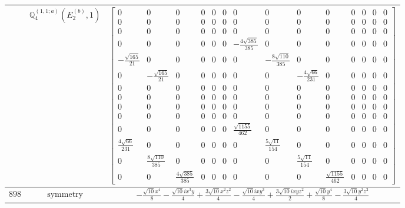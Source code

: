 \documentclass[fleqn,8pt,landscape]{jsarticle}
\begin{document}
\begin{longtable}{ccc}
$  $ & $ \mathbb{Q}_{4}^{(1,1;a)}(E_{2}^{(b)},1) $ & $ \begin{bmatrix} 0 & 0 & 0 & 0 & 0 & 0 & 0 & 0 & 0 & 0 & 0 & 0 & 0 & 0 \\ 0 & 0 & 0 & 0 & 0 & 0 & 0 & 0 & 0 & 0 & 0 & 0 & 0 & 0 \\ 0 & 0 & 0 & 0 & 0 & 0 & 0 & 0 & 0 & 0 & 0 & 0 & 0 & 0 \\ 0 & 0 & 0 & 0 & 0 & 0 & - \frac{4 \sqrt{385}}{385} & 0 & 0 & 0 & 0 & 0 & 0 & 0 \\ - \frac{\sqrt{165}}{21} & 0 & 0 & 0 & 0 & 0 & 0 & - \frac{8 \sqrt{110}}{385} & 0 & 0 & 0 & 0 & 0 & 0 \\ 0 & - \frac{\sqrt{165}}{21} & 0 & 0 & 0 & 0 & 0 & 0 & - \frac{4 \sqrt{66}}{231} & 0 & 0 & 0 & 0 & 0 \\ 0 & 0 & 0 & 0 & 0 & 0 & 0 & 0 & 0 & 0 & 0 & 0 & 0 & 0 \\ 0 & 0 & 0 & 0 & 0 & 0 & 0 & 0 & 0 & 0 & 0 & 0 & 0 & 0 \\ 0 & 0 & 0 & 0 & 0 & 0 & 0 & 0 & 0 & 0 & 0 & 0 & 0 & 0 \\ 0 & 0 & 0 & 0 & 0 & 0 & 0 & 0 & 0 & 0 & 0 & 0 & 0 & 0 \\ 0 & 0 & 0 & 0 & 0 & 0 & \frac{\sqrt{1155}}{462} & 0 & 0 & 0 & 0 & 0 & 0 & 0 \\ \frac{4 \sqrt{66}}{231} & 0 & 0 & 0 & 0 & 0 & 0 & \frac{5 \sqrt{11}}{154} & 0 & 0 & 0 & 0 & 0 & 0 \\ 0 & \frac{8 \sqrt{110}}{385} & 0 & 0 & 0 & 0 & 0 & 0 & \frac{5 \sqrt{11}}{154} & 0 & 0 & 0 & 0 & 0 \\ 0 & 0 & \frac{4 \sqrt{385}}{385} & 0 & 0 & 0 & 0 & 0 & 0 & \frac{\sqrt{1155}}{462} & 0 & 0 & 0 & 0 \end{bmatrix} $ \\ \hline
$ 898 $ & $ \text{symmetry} $ & $ - \frac{\sqrt{10} x^{4}}{8} - \frac{\sqrt{10} i x^{3} y}{4} + \frac{3 \sqrt{10} x^{2} z^{2}}{4} - \frac{\sqrt{10} i x y^{3}}{4} + \frac{3 \sqrt{10} i x y z^{2}}{2} + \frac{\sqrt{10} y^{4}}{8} - \frac{3 \sqrt{10} y^{2} z^{2}}{4} $ \\

\end{longtable}
\end{document}
